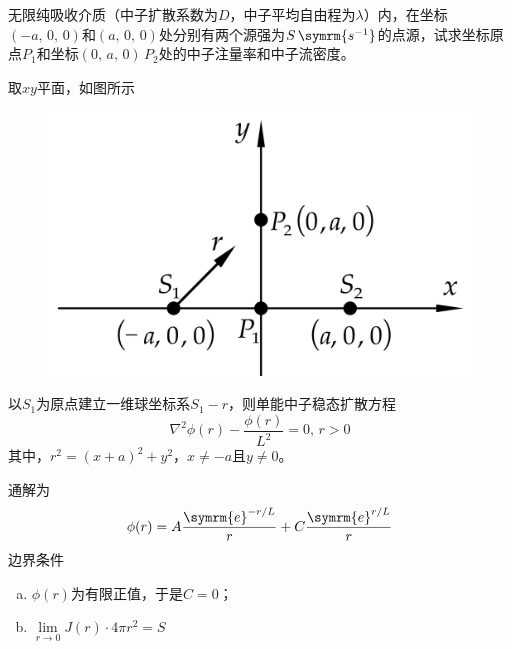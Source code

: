 \begin{exercise}
    无限纯吸收介质（中子扩散系数为$D$，中子平均自由程为$\lambda$）内，在坐标$(-a,\,0,\,0)$和$(a,\,0,\,0)$处分别有两个源强为$S\,\symrm{s^{-1}}$的点源，试求坐标原点$P_1$和坐标$(0,\,a,\,0)\,P_2$处的中子注量率和中子流密度。
    \begin{solution}
        取$xy$平面，如图所示
        \begin{figure}[H]
            \centering
            \includegraphics[scale=1.5]{figures/fig4.4.png}
        \end{figure}
        以$S_1$为原点建立一维球坐标系$S_1-r$，则单能中子稳态扩散方程
        \begin{equation*}
            \nabla^2\phi(r)-\frac{\phi(r)}{L^2} = 0,\,r>0
        \end{equation*}
        其中，$r^2 = (x+a)^2+y^2$，$x\neq -a$且$y\neq 0$。

        通解为
        \begin{equation*}
            \phi(r) = A\frac{\symrm{e}^{-r/L}}{r} + C\frac{\symrm{e}^{r/L}}{r}
        \end{equation*}
        边界条件
        \begin{enumerate}[(a)]
            \item $\phi(r)$为有限正值，于是$C=0$；
            \item $\lim\limits_{r\to 0} J(r)\cdot 4\pi r^2 = S$
        \end{enumerate}


\end{solution}
\end{exercise}
